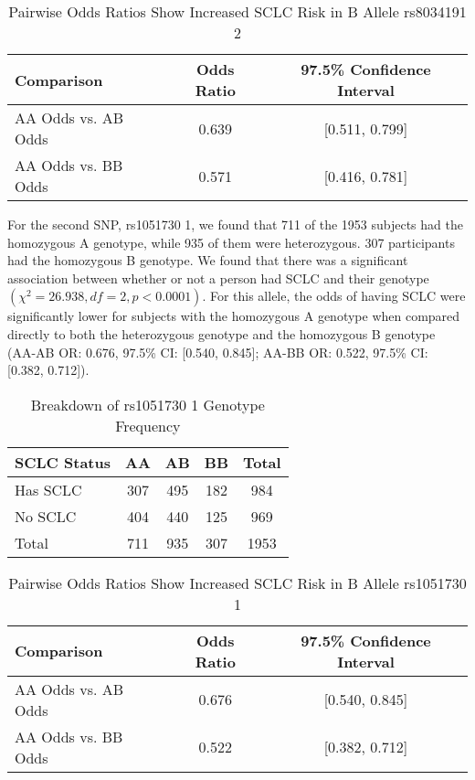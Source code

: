 \documentclass{article}
\begin{document}
	\begin{table}[h]
		\centering
		\footnotesize
		\renewcommand{\arraystretch}{1.2}
		\begin{tabular}{l c c}
			\toprule
			\textbf{Comparison} & \textbf{Odds Ratio} & \textbf{97.5\% Confidence Interval} \\
			\midrule
			AA Odds vs. AB Odds & 0.639 & [0.511, 0.799] \\
			AA Odds vs. BB Odds & 0.571 & [0.416, 0.781] \\
			\bottomrule
		\end{tabular}
		\caption{Pairwise Odds Ratios Show Increased SCLC Risk in B Allele rs8034191 2}
		\label{tab:odds_ratios}
	\end{table}

	\newpage
	For the second SNP, rs1051730 1, we found that 711 of the 1953 subjects had the homozygous A genotype, while 935 of them were heterozygous. 307 participants had the homozygous B genotype. We found that there was a significant association between whether or not a person had SCLC and their genotype $(\chi^2 = 26.938, df = 2, p < 0.0001)$. For this allele, the odds of having SCLC were significantly lower for subjects with the homozygous A genotype when compared directly to both the heterozygous genotype and the homozygous B genotype (AA-AB OR: 0.676, 97.5\% CI: [0.540, 0.845]; AA-BB OR: 0.522, 97.5\% CI: [0.382, 0.712]).

	\begin{table}[h]
		\centering
		\footnotesize
		\renewcommand{\arraystretch}{1.2}
		\begin{tabular}{l c c c c}
			\toprule
			\textbf{SCLC Status} & \textbf{AA} & \textbf{AB} & \textbf{BB} & \textbf{Total} \\
			\midrule
			Has SCLC & 307 & 495 & 182 & 984 \\
			No SCLC & 404 & 440 & 125 & 969 \\
			\midrule
			Total & 711 & 935 & 307 & 1953 \\
			\bottomrule
		\end{tabular}
		\caption{Breakdown of rs1051730 1 Genotype Frequency}
		\label{tab:genotype_rs1051730}
	\end{table}

	\begin{table}[h]
		\centering
		\footnotesize
		\renewcommand{\arraystretch}{1.2}
		\begin{tabular}{l c c}
			\toprule
			\textbf{Comparison} & \textbf{Odds Ratio} & \textbf{97.5\% Confidence Interval} \\
			\midrule
			AA Odds vs. AB Odds & 0.676 & [0.540, 0.845] \\
			AA Odds vs. BB Odds & 0.522 & [0.382, 0.712] \\
			\bottomrule
		\end{tabular}
		\caption{Pairwise Odds Ratios Show Increased SCLC Risk in B Allele rs1051730 1}
		\label{tab:odds_rs1051730}
	\end{table}
\end{document}
